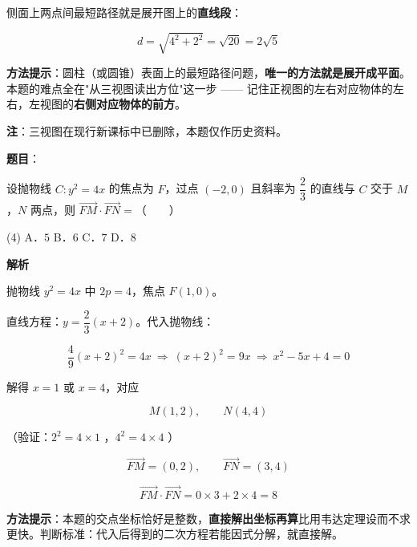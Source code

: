 \begin{answer}
侧面上两点间最短路径就是展开图上的\textbf{直线段}：

\nopagebreak[4]
\[d=\sqrt{4^{2}+2^{2}}=\sqrt{20}=2\sqrt5\]

\begin{gktip}
\textbf{方法提示}：圆柱（或圆锥）表面上的最短路径问题，\textbf{唯一的方法就是展开成平面}。本题的难点全在"从三视图读出方位"这一步 —— 记住正视图的左右对应物体的左右，左视图的\textbf{右侧对应物体的前方}。

\textbf{注}：三视图在现行新课标中已删除，本题仅作历史资料。
\end{gktip}


\par\medskip

\end{answer}
\begin{answer}

\textbf{题目}：

设抛物线 $C:y^{2}=4x$ 的焦点为 $F$，过点 $(-2,0)$ 且斜率为 $\dfrac23$ 的直线与 $C$ 交于 $M$，$N$ 两点，则 $\overrightarrow{FM}\cdot\overrightarrow{FN}=$\mbox{（　　）}

\begin{gkopts}(4)
\task A．$5$
\task B．$6$
\task C．$7$
\task D．$8$
\end{gkopts}

\textbf{解析}

抛物线 $y^{2}=4x$ 中 $2p=4$，焦点 $F(1,0)$。

直线方程：$y=\dfrac23(x+2)$。代入抛物线：

\nopagebreak[4]
\[\frac49(x+2)^{2}=4x\ \Longrightarrow\ (x+2)^{2}=9x\ \Longrightarrow\ x^{2}-5x+4=0\]

解得 $x=1$ 或 $x=4$，对应

\nopagebreak[4]
\[M(1,2),\qquad N(4,4)\]

（验证：$2^{2}=4\times1$ ，$4^{2}=4\times4$ ）

\nopagebreak[4]
\[\overrightarrow{FM}=(0,2),\qquad \overrightarrow{FN}=(3,4)\]

\nopagebreak[4]
\[\overrightarrow{FM}\cdot\overrightarrow{FN}=0\times3+2\times4=8\]

\begin{gktip}
\textbf{方法提示}：本题的交点坐标恰好是整数，\textbf{直接解出坐标再算}比用韦达定理设而不求更快。判断标准：代入后得到的二次方程若能因式分解，就直接解。
\end{gktip}


\par\medskip

\end{answer}

